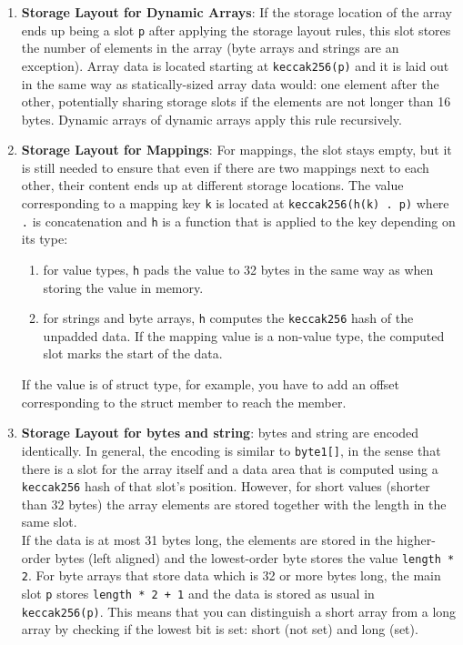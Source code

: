 \begin{enumerate}
\item\textbf{Storage Layout for Dynamic Arrays}: If the storage location of the array ends up being a slot \verb|p| after applying the storage layout rules, this slot stores the number of elements in the array (byte arrays and strings are an exception). Array data is located starting at \verb|keccak256(p)| and it is laid out in the same way as statically-sized array data would: one element after the other, potentially sharing storage slots if the elements are not longer than 16 bytes. Dynamic arrays of dynamic arrays apply this rule recursively.

\item\textbf{Storage Layout for Mappings}: For mappings, the slot stays empty, but it is still needed to ensure that even if there are two mappings next to each other, their content ends up at different storage locations. The value corresponding to a mapping key \verb|k| is located at \verb|keccak256(h(k) . p)| where \verb|.| is concatenation and \verb|h| is a function that is applied to the key depending on its type:
    \begin{enumerate}
    \item for value types, \verb|h| pads the value to 32 bytes in the same way as when storing the value in memory.
    \item for strings and byte arrays, \verb|h| computes the \verb|keccak256| hash of the unpadded data. If the mapping value is a non-value type, the computed slot marks the start of the data.
    \end{enumerate}
If the value is of struct type, for example, you have to add an offset corresponding to the struct member to reach the member.

\item\textbf{Storage Layout for bytes and string}: bytes and string are encoded identically. In general, the encoding is similar to \verb|byte1[]|, in the sense that there is a slot for the array itself and a data area that is computed using a \verb|keccak256| hash of that slot’s position. However, for short values (shorter than 32 bytes) the array elements are stored together with the length in the same slot.\\

If the data is at most 31 bytes long, the elements are stored in the higher-order bytes (left aligned) and the lowest-order byte stores the value \verb|length * 2|. For byte arrays that store data which is 32 or more bytes long, the main slot \verb|p| stores \verb|length * 2 + 1| and the data is stored as usual in \verb|keccak256(p)|. This means that you can distinguish a short array from a long array by checking if the lowest bit is set: short (not set) and long (set).


\end{enumerate}
